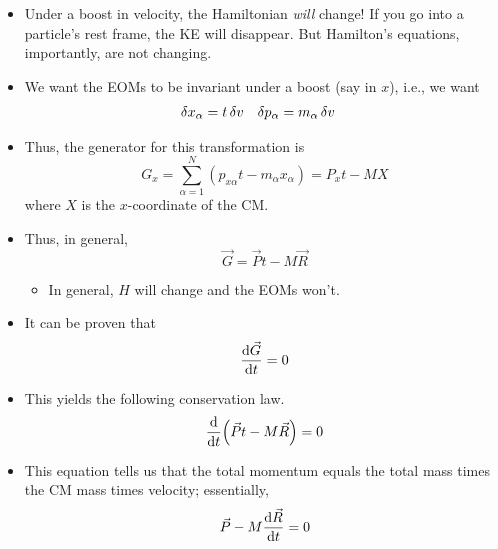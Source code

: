 \documentclass[../notes.tex]{subfiles}
\begin{document}
\begin{itemize}
\begin{enumerate}
\begin{itemize}
            \item Under a boost in velocity, the Hamiltonian \emph{will} change! If you go into a particle's rest frame, the KE will disappear. But Hamilton's equations, importantly, are not changing.
            \item We want the EOMs to be invariant under a boost (say in $x$), i.e., we want
            \begin{align*}
                \var{x_\alpha} &= t\var{v}&
                \var{p_\alpha} &= m_\alpha\var{v}
            \end{align*}
            \item Thus, the generator for this transformation is
            \begin{equation*}
                G_x = \sum_{\alpha=1}^N(p_{x\alpha}t-m_\alpha x_\alpha) = P_xt-MX
            \end{equation*}
            where $X$ is the $x$-coordinate of the CM.
            \item Thus, in general,
            \begin{equation*}
                \vec{G} = \vec{P}t-M\vec{R}
            \end{equation*}
            \begin{itemize}
                \item In general, $H$ will change and the EOMs won't.
            \end{itemize}
            \item It can be proven that
            \begin{equation*}
                \dv{\vec{G}}{t} = 0
            \end{equation*}
            \item This yields the following conservation law.
            \begin{equation*}
                \dv{t}(\vec{P}t-M\vec{R}) = 0
            \end{equation*}
            \item This equation tells us that the total momentum equals the total mass times the CM mass times velocity; essentially,
            \begin{equation*}
                \vec{P}-M\dv{\vec{R}}{t} = 0
            \end{equation*}
        \end{itemize}
    \end{enumerate}
\end{itemize}
\end{document}
